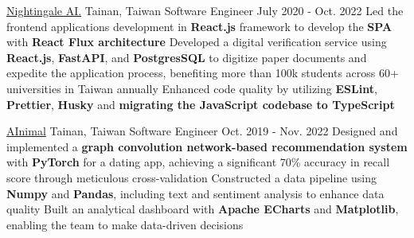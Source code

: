 \resumeExpEntry
{\href{https://19gale.ai}{Nightingale AI.}}
{Tainan, Taiwan}
{Software Engineer}
{July 2020 - Oct. 2022}
{
  \resumeItemListStart
    \resumeItem
    {Led the frontend applications development in \textbf{React.js} framework to develop the \textbf{SPA} with \textbf{React Flux architecture}}
    \resumeItem
    {Developed a digital verification service using \textbf{React.js}, \textbf{FastAPI}, and \textbf{PostgresSQL} to digitize paper documents and expedite the application process, benefiting more than 100k students across 60+ universities in Taiwan annually}
    \resumeItem
    {Enhanced code quality by utilizing \textbf{ESLint}, \textbf{Prettier}, \textbf{Husky} and \textbf{migrating the JavaScript codebase to TypeScript}}
  \resumeItemListEnd
}

\resumeExpEntry
{\href{https://ainimal.io}{AInimal}}
{Tainan, Taiwan}
{Software Engineer}
{Oct. 2019 - Nov. 2022}
{
  \resumeItemListStart
    \resumeItem
    {Designed and implemented a \textbf{graph convolution network-based recommendation system} with \textbf{PyTorch} for a dating app, achieving a significant 70\% accuracy in recall score through meticulous cross-validation}
    \resumeItem
    {Constructed a data pipeline using \textbf{Numpy} and \textbf{Pandas}, including text and sentiment analysis to enhance data quality}
    \resumeItem
    {Built an analytical dashboard with \textbf{Apache ECharts} and \textbf{Matplotlib}, enabling the team to make data-driven decisions}
  \resumeItemListEnd
}

